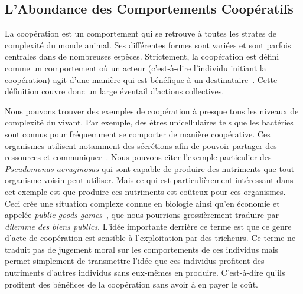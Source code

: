 	\subsection{L'Abondance des Comportements Coopératifs}

		La coopération est un comportement qui se retrouve à toutes les strates de complexité du monde animal. Ses différentes formes sont variées et sont parfois centrales dans de nombreuses espèces. Strictement, la coopération est défini comme un comportement où un acteur (c'est-à-dire l'individu initiant la coopération) agit d'une manière qui est bénéfique à un destinataire~\parencite{West2007a}. Cette définition couvre donc un large éventail d'actions collectives.

		Nous pouvons trouver des exemples de coopération à presque tous les niveaux de complexité du vivant. Par exemple, des êtres unicellulaires tels que les bactéries sont connus pour fréquemment se comporter de manière coopérative. Ces organismes utilisent notamment des sécrétions afin de pouvoir partager des ressources et communiquer~\parencite{Elena2003}. Nous pouvons citer l'exemple particulier des \emph{Pseudomonas aeruginosas} qui sont capable de produire des nutriments que tout organisme voisin peut utiliser. Mais ce qui est particulièrement intéressant dans cet exemple est que produire ces nutriments est coûteux pour ces organismes. Ceci crée une situation complexe connue en biologie ainsi qu'en économie et appelée \emph{public goods games}~\parencite{Popat2012, Harrison2013}, que nous pourrions grossièrement traduire par \emph{dilemme des biens publics}. L'idée importante derrière ce terme est que ce genre d'acte de coopération est sensible à l'exploitation par des tricheurs. Ce terme ne traduit pas de jugement moral sur les comportements de ces individus mais permet simplement de transmettre l'idée que ces individus profitent des nutriments d'autres individus sans eux-mêmes en produire. C'est-à-dire qu'ils profitent des bénéfices de la coopération sans avoir à en payer le coût.

